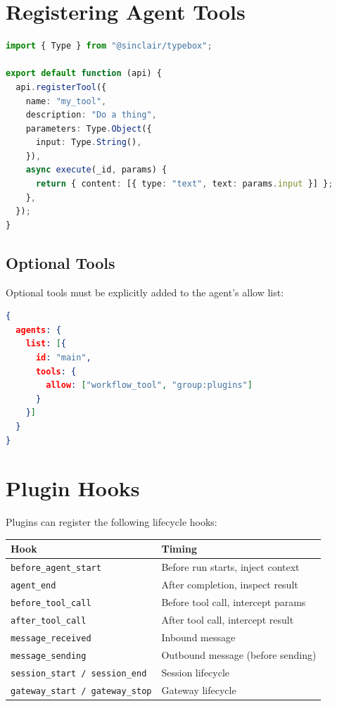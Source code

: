 \section{Registering Agent Tools}

\begin{lstlisting}[language=typescript]
import { Type } from "@sinclair/typebox";

export default function (api) {
  api.registerTool({
    name: "my_tool",
    description: "Do a thing",
    parameters: Type.Object({
      input: Type.String(),
    }),
    async execute(_id, params) {
      return { content: [{ type: "text", text: params.input }] };
    },
  });
}
\end{lstlisting}

\subsection{Optional Tools}

Optional tools must be explicitly added to the agent's allow list:

\begin{lstlisting}[language=json]
{
  agents: {
    list: [{
      id: "main",
      tools: {
        allow: ["workflow_tool", "group:plugins"]
      }
    }]
  }
}
\end{lstlisting}

\section{Plugin Hooks}

Plugins can register the following lifecycle hooks:

\begin{center}
\begin{tabular}{ll}
\toprule
\textbf{Hook} & \textbf{Timing} \\
\midrule
\texttt{before\_agent\_start} & Before run starts, inject context \\
\texttt{agent\_end} & After completion, inspect result \\
\texttt{before\_tool\_call} & Before tool call, intercept params \\
\texttt{after\_tool\_call} & After tool call, intercept result \\
\texttt{message\_received} & Inbound message \\
\texttt{message\_sending} & Outbound message (before sending) \\
\texttt{session\_start / session\_end} & Session lifecycle \\
\texttt{gateway\_start / gateway\_stop} & Gateway lifecycle \\
\bottomrule
\end{tabular}
\end{center}

